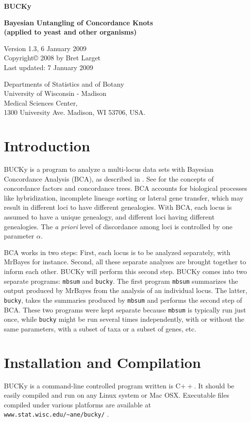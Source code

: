 \documentclass[12pt,english,final,letterpaper]{article}
\newcommand{\bu}{BUCKy}
\begin{document}
\begin{center}
{\Large\bf BUCKy}

{\bf Bayesian Untangling of Concordance Knots\\
(applied to yeast and other organisms)}
\bigskip

Version 1.3, 6 January 2009\\
Copyright\copyright{} 2008 by Bret Larget\\
Last updated: 7 January 2009
\medskip

{\small
Departments of Statistics and of Botany\\ 
University of Wisconsin - Madison\\ 
Medical Sciences Center,\\ 
1300 University Ave. Madison, WI 53706, USA.
}
\end{center}


\section{Introduction}
\bu{} is a program to analyze a multi-locus data sets with 
Bayesian Concordance Analysis (BCA), as described in \cite{ane-etal-2007}.
See \cite{baum-2007} for the concepts of concordance factors and
concordance trees.
BCA accounts for biological processes like hybridization, 
incomplete lineage sorting or lateral gene transfer, which may result
in different loci to have different genealogies. With BCA,
each locus is assumed to have a unique genealogy, and different
loci having different genealogies. The {\it a priori} level of 
discordance among loci is controlled by one parameter $\alpha$.

BCA works in two steps: First, each locus is to be analyzed 
separately, with MrBayes for instance. Second, all these separate
analyses are brought together to inform each other. \bu{} will
perform this second step.
\bu{} comes into two separate programs: {\tt mbsum} and {\tt bucky}.
The first program {\tt mbsum} summarizes the output produced by MrBayes
from the analysis of an individual locus. The latter, {\tt bucky}, 
takes the summaries produced by {\tt mbsum} and performs the second step
of BCA. These two programs were kept separate because {\tt mbsum}
is typically run just once, while {\tt bucky} might be run several
times  independently, with or without the same parameters, with
a subset of taxa or a subset of genes, etc.

\section{Installation and Compilation}
\bu{} is a command-line controlled program written is C$++$.
It should be easily compiled and run on any Linux system or Mac OSX.
Executable files compiled under various platforms are available
at \verb+www.stat.wisc.edu/~ane/bucky/+ .
\end{document}

